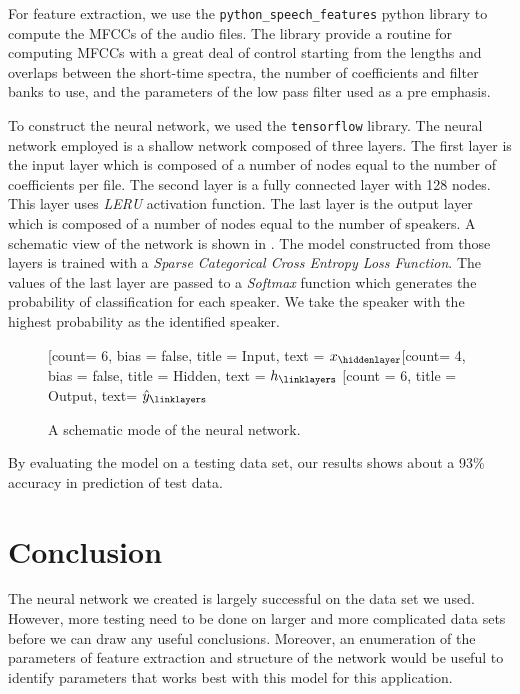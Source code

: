 \documentclass[twocolumn]{article}
\begin{document}
For feature extraction, we use the \texttt{python\_speech\_features} python
library to compute the MFCCs of the audio files. The library provide a routine
for computing MFCCs with a great deal of control starting from the lengths and
overlaps between the short-time spectra, the number of coefficients and filter
banks to use, and the parameters of the low pass filter used as a pre emphasis.

To construct the neural network, we used the \texttt{tensorflow} library. The
neural network employed is a shallow network composed of three layers. The
first layer is the input layer which is composed of a number of nodes equal to
the number of coefficients per file. The second layer is a fully connected
layer with 128 nodes. This layer uses \emph{LERU} activation function. The last
layer is the output layer which is composed of a number of nodes equal to the
number of speakers. A schematic view of the network is shown in
. The model constructed from those layers is trained
with a \emph{Sparse Categorical Cross Entropy Loss Function}. The values of the
last layer are passed to a \emph{Softmax} function which generates the
probability of classification for each speaker. We take the speaker with the
highest probability as the identified speaker.

\begin{figure}
\begin{center}
\begin{neuralnetwork}[height = 6]
  \newcommand{\x}[2]{$x_#2$}
  \newcommand{\y}[2]{$\hat{y}_#2$}
  \newcommand{\hidden}[2]{\small $h_#2$}
  [count= 6, bias = false, title = Input, text = \x]
  \hiddenlayer[count= 4, bias = false, title = Hidden, text = \hidden]
  \linklayers
  \outputlayer[count = 6, title = Output, text= \y]
  \linklayers
\end{neuralnetwork}
\end{center}
\caption{A schematic mode of the neural network.}
\label{fig:NeuralNetwork}
\end{figure}

By evaluating the model on a testing data set, our results shows about a 93\%
accuracy in prediction of test data.

\section{Conclusion}
\label{sec:Conclusion}

The neural network we created is largely successful on the data set we used.
However, more testing need to be done on larger and more complicated data sets
before we can draw any useful conclusions. Moreover, an enumeration of the
parameters of feature extraction and structure of the network would be useful
to identify parameters that works best with this model for this application.

\printbibliography
\end{document}
